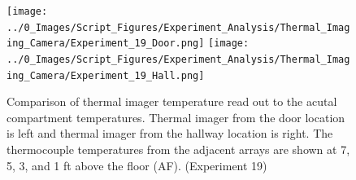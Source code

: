 \documentclass[12pt,oneside]{book}
\begin{document}

\begin{figure}[H]
\centering
\texttt{[image: ../0\_Images/Script\_Figures/Experiment\_Analysis/Thermal\_Imaging\_Camera/Experiment\_19\_Door.png]}
\texttt{[image: ../0\_Images/Script\_Figures/Experiment\_Analysis/Thermal\_Imaging\_Camera/Experiment\_19\_Hall.png]}
\caption[Thermal Imager H]{Comparison of thermal imager temperature read out to the acutal compartment temperatures. Thermal imager from the door location is left and thermal imager from the hallway location is right. The thermocouple temperatures from the adjacent arrays are shown at 7, 5, 3, and 1 ft above the floor (AF). (Experiment 19)}
\label{fig:thermal_imager_j}
\end{figure}
\end{document}

